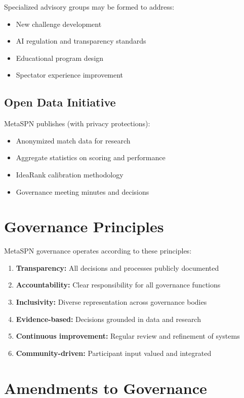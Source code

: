 Specialized advisory groups may be formed to address:
\begin{itemize}[leftmargin=*]
  \item New challenge development
  \item AI regulation and transparency standards
  \item Educational program design
  \item Spectator experience improvement
\end{itemize}

\subsection{Open Data Initiative}

MetaSPN publishes (with privacy protections):
\begin{itemize}[leftmargin=*]
  \item Anonymized match data for research
  \item Aggregate statistics on scoring and performance
  \item IdeaRank calibration methodology
  \item Governance meeting minutes and decisions
\end{itemize}

\section{Governance Principles}

MetaSPN governance operates according to these principles:

\begin{enumerate}
  \item \textbf{Transparency:} All decisions and processes publicly documented
  \item \textbf{Accountability:} Clear responsibility for all governance functions
  \item \textbf{Inclusivity:} Diverse representation across governance bodies
  \item \textbf{Evidence-based:} Decisions grounded in data and research
  \item \textbf{Continuous improvement:} Regular review and refinement of systems
  \item \textbf{Community-driven:} Participant input valued and integrated
\end{enumerate}

\section{Amendments to Governance}

